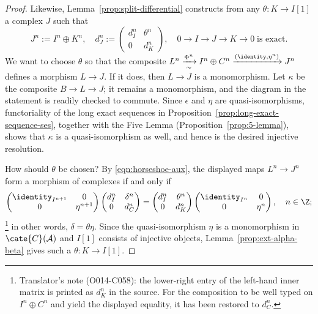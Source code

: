 \begin{proof}
	Likewise, Lemma~\ref{prop:split-differential} constructs from any
	$\theta:K\to I[1]$ a complex $J$ such that
	\[ J^n := I^n \oplus K^n, \quad d_J^n := \begin{pmatrix}
		d_I^n & \theta^n \\
		0 & d_K^n
	\end{pmatrix}, \quad 0 \to I \to J \to K \to 0 \;\text{is exact}. \]
	We want to choose $\theta$ so that the composite
	$L^n\xrightarrow[\sim]{\Phi^n}I^n\oplus C^n
	\xrightarrow{(\identity,\eta^n)}J^n$ defines a morphism $L\to J$. If it
	does, then $L\to J$ is a monomorphism. Let $\kappa$ be the composite
	$B\to L\to J$; it remains a monomorphism, and the diagram in the statement
	is readily checked to commute. Since $\epsilon$ and $\eta$ are
	quasi-isomorphisms, functoriality of the long exact sequences in
	Proposition~\ref{prop:long-exact-sequence-ses}, together with the Five
	Lemma (Proposition~\ref{prop:5-lemma}), shows that $\kappa$ is a
	quasi-isomorphism as well, and hence is the desired injective resolution.

	How should $\theta$ be chosen? By \eqref{eqn:horseshoe-aux}, the displayed
	maps $L^n\to J^n$ form a morphism of complexes if and only if
	\[\begin{pmatrix}
		\identity_{I^{n+1}} & 0 \\
		0 & \eta^{n+1}
	\end{pmatrix} \begin{pmatrix}
		d_I^n & \delta^n \\
		0 & d_C^n
	\end{pmatrix} = \begin{pmatrix}
		d_I^n & \theta^n \\
		0 & d_K^n \\
	\end{pmatrix} \begin{pmatrix}
		\identity_{I^n} & 0 \\
		0 & \eta^n
	\end{pmatrix}, \quad n \in \Z ; \]%
	\footnote{Translator's note (O014-C058): the lower-right entry of the
	left-hand inner matrix is printed as $d_K^n$ in the source. For the
	composition to be well typed on $I^n\oplus C^n$ and yield the displayed
	equality, it has been restored to $d_C^n$.}
	in other words, $\delta=\theta\eta$. Since the quasi-isomorphism $\eta$ is
	a monomorphism in $\cate{C}(\mathcal{A})$ and $I[1]$ consists of injective
	objects, Lemma~\ref{prop:ext-alpha-beta} gives such a
	$\theta:K\to I[1]$.
\end{proof}

